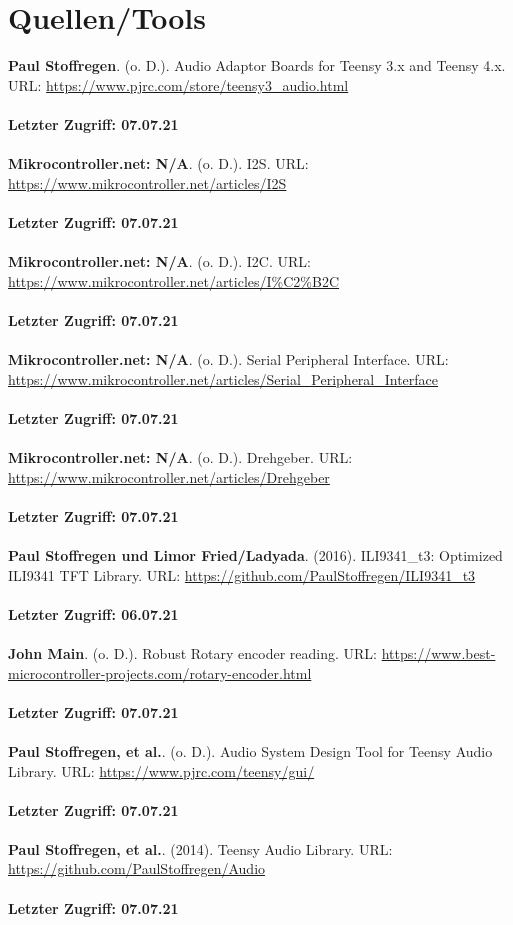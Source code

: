 \documentclass[12pt]{article}
\begin{document}
\section{Quellen/Tools}
\rbrack\:\textbf{Paul Stoffregen}. (o. D.). Audio Adaptor Boards for Teensy 3.x and Teensy 4.x.
URL: 
\url{https://www.pjrc.com/store/teensy3_audio.html}
\\
\\
\textbf{Letzter Zugriff: 07.07.21}
\\
\\
\rbrack\:\textbf{Mikrocontroller.net: N/A}. (o. D.). I2S.
URL: 
\url{https://www.mikrocontroller.net/articles/I2S}
\\
\\
\textbf{Letzter Zugriff: 07.07.21}
\\
\\
\rbrack\:\textbf{Mikrocontroller.net: N/A}. (o. D.). I2C.
URL: 
\url{https://www.mikrocontroller.net/articles/I%C2%B2C}
\\
\\
\textbf{Letzter Zugriff: 07.07.21}
\\
\\
\rbrack\:\textbf{Mikrocontroller.net: N/A}. (o. D.). Serial Peripheral Interface.
URL: 
\url{https://www.mikrocontroller.net/articles/Serial_Peripheral_Interface}
\\
\\
\textbf{Letzter Zugriff: 07.07.21}
\\
\\
\rbrack\:\textbf{Mikrocontroller.net: N/A}. (o. D.). Drehgeber.
URL: 
\url{https://www.mikrocontroller.net/articles/Drehgeber}
\\
\\
\textbf{Letzter Zugriff: 07.07.21}
\\
\\
\rbrack\:\textbf{Paul Stoffregen und Limor Fried/Ladyada}. (2016). ILI9341\_t3: Optimized ILI9341 TFT Library.
URL: 
\url{https://github.com/PaulStoffregen/ILI9341_t3}
\\
\\
\textbf{Letzter Zugriff: 06.07.21}
\\
\\
\rbrack\:\textbf{John Main}. (o. D.). Robust Rotary encoder reading.
URL: 
\url{https://www.best-microcontroller-projects.com/rotary-encoder.html}
\\
\\
\textbf{Letzter Zugriff: 07.07.21}
\\
\\
\rbrack\:\textbf{Paul Stoffregen, et al.}. (o. D.). Audio System Design Tool for Teensy Audio Library.
URL: 
\url{https://www.pjrc.com/teensy/gui/}
\\
\\
\textbf{Letzter Zugriff: 07.07.21}
\\
\\
\rbrack\:\textbf{Paul Stoffregen, et al.}. (2014).  Teensy Audio Library.
URL: 
\url{https://github.com/PaulStoffregen/Audio}
\\
\\
\textbf{Letzter Zugriff: 07.07.21}
\end{document}
